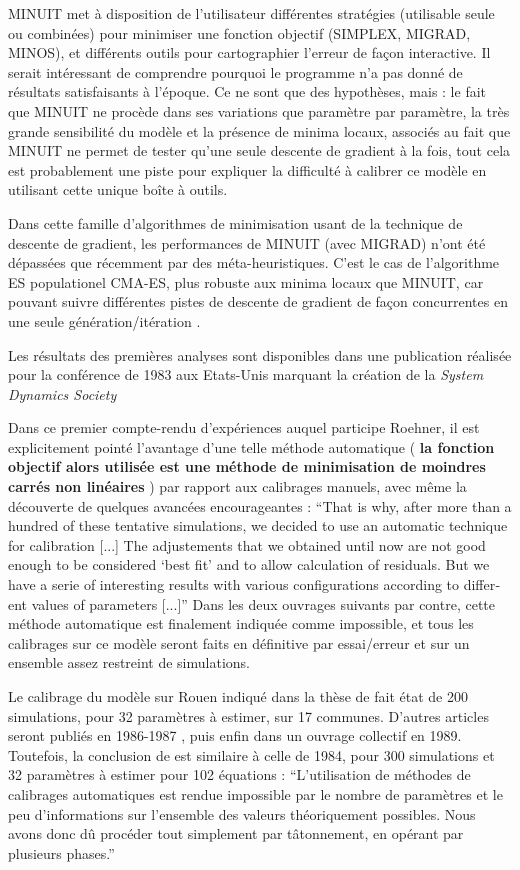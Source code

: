 MINUIT met à disposition de l’utilisateur différentes stratégies (utilisable seule ou combinées) pour minimiser une fonction objectif (SIMPLEX, MIGRAD, MINOS), et différents outils pour cartographier l’erreur de façon interactive.  Il serait intéressant de comprendre pourquoi le programme n’a pas donné de résultats satisfaisants à l’époque. Ce ne sont que des hypothèses, mais : le fait que MINUIT ne procède dans ses variations que paramètre par paramètre, la très grande sensibilité du modèle et la présence de minima locaux, associés au fait que MINUIT ne permet de tester qu’une seule descente de gradient à la fois, tout cela est probablement une piste pour expliquer la difficulté à calibrer ce modèle en utilisant cette unique boîte à outils.

Dans cette famille d’algorithmes de minimisation usant de la technique de descente de gradient, les performances de MINUIT (avec MIGRAD) n’ont été dépassées que récemment par des méta-heuristiques. C’est le cas de l’algorithme ES populationel CMA-ES, plus robuste aux minima locaux que MINUIT, car pouvant suivre différentes pistes de descente de gradient de façon concurrentes en une seule génération/itération \autocite{Berlich2003}.

Les résultats des premières analyses sont disponibles dans une publication \autocite{Pumain1983b} réalisée pour la conférence de 1983 aux Etats-Unis marquant la création \autocite{Andersen2007} de la \textit{System Dynamics Society}

Dans ce premier compte-rendu d'expériences auquel participe Roehner, il est explicitement pointé l’avantage d’une telle méthode automatique ( \textbf{la fonction objectif alors utilisée est une méthode de minimisation de moindres carrés non linéaires }) par rapport aux calibrages manuels, avec même la découverte de quelques avancées encourageantes : \foreignquote{english}{That is why, after more than a hundred of these tentative simulations, we decided to use an automatic technique for calibration [...] The adjustements that we obtained until now are not good enough to be considered \enquote{best fit} and to allow calculation of residuals. But we have a serie of interesting results with various configurations according to different values of parameters [...]} Dans les deux ouvrages suivants par contre, cette méthode automatique est finalement indiquée comme impossible, et tous les calibrages sur ce modèle seront faits en définitive par essai/erreur et sur un ensemble assez restreint de simulations.

Le calibrage du modèle sur Rouen indiqué dans la thèse de \autocites[348,354]{Sanders1984}{Sanders1985} fait état de 200 simulations, pour 32 paramètres à estimer, sur 17 communes. D'autres articles seront publiés en 1986-1987 \autocites{Pumain1986,Pumain1987}, puis enfin dans un ouvrage collectif en 1989. Toutefois, la conclusion de \textcite[112]{Pumain1989} est similaire à celle de 1984, pour 300 simulations et 32 paramètres à estimer pour 102 équations : \enquote{L’utilisation de méthodes de calibrages automatiques est rendue impossible par le nombre de paramètres et le peu d’informations sur l’ensemble des valeurs théoriquement possibles. Nous avons donc dû procéder tout simplement par tâtonnement, en opérant par plusieurs phases.}

